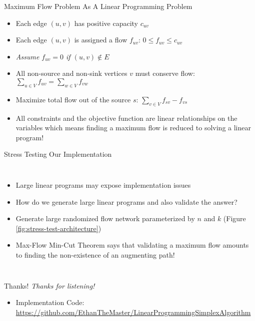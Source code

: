 \documentclass{beamer}
\begin{document}
\begin{frame}{Maximum Flow Problem As A Linear Programming Problem}
    \begin{itemize}
        \item<1-> Each edge $(u, v)$ has positive capacity $c_{uv}$
        \item<2-> Each edge $(u,v)$ is assigned a flow $f_{uv}$: $0 \leq f_{uv} \leq c_{uv}$
        \item<2-> \textit{Assume $f_{uv} = 0$ if $(u, v) \notin E$}
        \item<3-> All non-source and non-sink vertices $v$ must conserve flow: $\sum_{u \in V}f_{uv} = \sum_{w \in V}f_{vw}$
        \item<4-> Maximize total flow out of the source $s$: $\sum_{v \in V} f_{sv} - f_{vs}$
        \item<5-> All constraints and the objective function are linear relationships on the variables which means finding a maximum flow is reduced to solving a linear program! 
    \end{itemize}
\end{frame}

\begin{frame}{Stress Testing Our Implementation}
    \begin{columns}
        \begin{itemize}
            \item<1-> Large linear programs may expose implementation issues
            \item<2-> How do we generate large linear programs and also validate the answer?
            \item<3-> Generate large randomized flow network parameterized by $n$ and $k$ (Figure \ref{fig:stress-test-architecture})
            \item<4-> Max-Flow Min-Cut Theorem says that validating a maximum flow amounts to finding the non-existence of an augmenting path!
        \end{itemize}
    \end{columns}
\end{frame}
\begin{frame}{Thanks!}
    \emph{Thanks for listening!}
    
    \begin{itemize}
        \item Implementation Code: \url{https://github.com/EthanTheMaster/LinearProgrammingSimplexAlgorithm}
    \end{itemize}
\end{frame}
\end{document}
